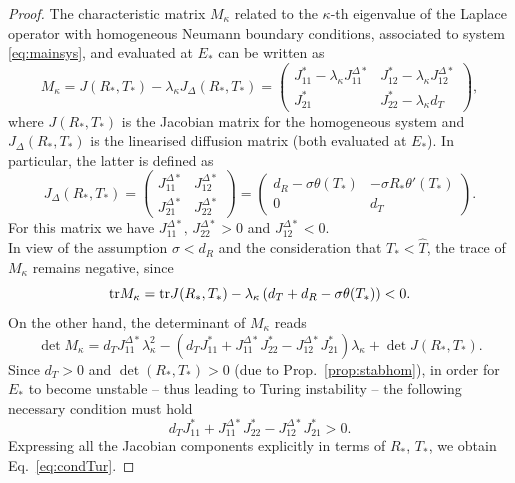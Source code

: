 \documentclass[11pt]{elsarticle}
\theoremstyle{plain}
\theoremstyle{definition}
\theoremstyle{myremark}
\begin{document}
\begin{proof}
The characteristic matrix $M_\kappa$ related to the $\kappa$-th eigenvalue of the Laplace operator with homogeneous Neumann boundary conditions, associated to system \eqref{eq:mainsys}, and evaluated at $E_*$ can be written as
\begin{equation}
    M_\kappa = J(R_*,T_*) -\lambda_\kappa J_\Delta(R_*,T_*) = \begin{pmatrix} 
J_{11}^*-\lambda_\kappa J^{\Delta*}_{11} & J_{12}^*-\lambda_\kappa J^{\Delta*}_{12} \\[0.3cm] 
J_{21}^* & J_{22}^*-\lambda_\kappa d_T
\end{pmatrix},
\end{equation}
where $J(R_*,T_*)$ is the Jacobian matrix for the homogeneous system and $J_\Delta(R_*,T_*)$ is the linearised diffusion matrix (both evaluated at $E_*$). In particular, the latter is defined as
\begin{equation*}
J_\Delta(R_*,T_*)=
\begin{pmatrix} 
J^{\Delta*}_{11} & J^{\Delta*}_{12} \\[0.2cm]
J^{\Delta*}_{21} & J^{\Delta*}_{22} 
\end{pmatrix}=
\begin{pmatrix} 
d_R-\sigma \theta(T_*) & -\sigma R_* \theta'(T_*)\\[0.3cm] 
0 & d_T
\end{pmatrix}.
\end{equation*}
For this matrix we have $J^{\Delta*}_{11},\,J^{\Delta*}_{22}>0$ and $J^{\Delta*}_{12}<0$.\\
In view of the assumption $\sigma<d_R$ and the consideration that $T_*<\hat{T}$, the trace of $M_\kappa$ remains negative, since
\[
\textnormal{tr}M_\kappa=\textnormal{tr}J(R_*,T_*)-\lambda_\kappa\left(d_T+d_R-\sigma \theta(T_*)\right)<0.
\]
On the other hand, the determinant of $M_\kappa$ reads
\[
\det M_\kappa=
d_T J^{\Delta*}_{11} \lambda_\kappa^2
-\left( d_T J^{*}_{11}+ J^{\Delta*}_{11}J^{*}_{22}
-J^{\Delta *}_{12}J^{*}_{21}\right) \lambda_\kappa
+\det J(R_*,T_*).
\]
Since $d_T>0$ and $\det (R_*,T_*)>0$ (due to Prop.~\ref{prop:stabhom}), in order for $E_*$ to become unstable -- thus leading to Turing instability -- the following necessary condition must hold
\[
d_T J^{*}_{11}+ J^{\Delta*}_{11}J^{*}_{22} -J^{\Delta *}_{12}J^{*}_{21}>0.
\]
Expressing all the Jacobian components explicitly in terms of $R_*$, $T_*$, we obtain Eq.~\eqref{eq:condTur}.
\end{proof}
\end{document}
